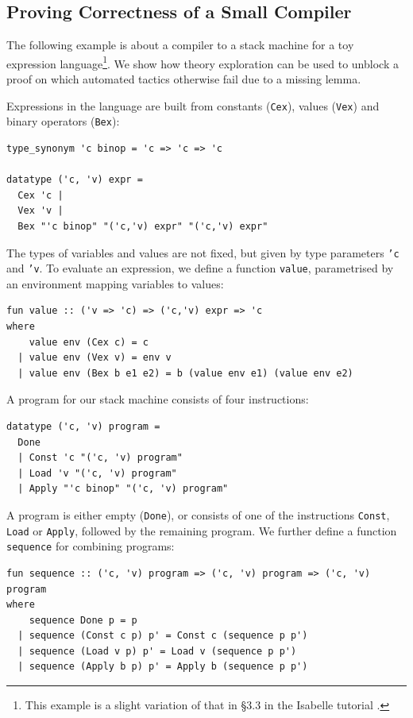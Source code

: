 \subsection{Proving Correctness of a Small Compiler}
\label{sec:comp-ex}
The following example is about a compiler to a stack machine for a toy
expression language\footnote{This example is a slight variation of that in \S3.3 in the Isabelle tutorial \cite{isabelle}. }. We show how theory exploration can be used to unblock a proof on which automated tactics otherwise fail due to a missing lemma.

Expressions in the language are built from constants (\texttt{Cex}), values (\texttt{Vex}) and binary operators (\texttt{Bex}): 
\begin{small}
\begin{verbatim}
type_synonym 'c binop = 'c => 'c => 'c

datatype ('c, 'v) expr =
  Cex 'c |
  Vex 'v |
  Bex "'c binop" "('c,'v) expr" "('c,'v) expr"
\end{verbatim}
\end{small}
The types of variables and values are not fixed, but given by type parameters \texttt{'c} and \texttt{'v}.
To evaluate an expression, we define a function \texttt{value}, parametrised by an environment mapping variables to values:
\begin{small}
\begin{verbatim}
fun value :: ('v => 'c) => ('c,'v) expr => 'c
where
    value env (Cex c) = c 
  | value env (Vex v) = env v
  | value env (Bex b e1 e2) = b (value env e1) (value env e2)
\end{verbatim}
\end{small}
A program for our stack machine consists of four instructions:
\begin{small}
\begin{verbatim}
datatype ('c, 'v) program =
  Done
  | Const 'c "('c, 'v) program"
  | Load 'v "('c, 'v) program"
  | Apply "'c binop" "('c, 'v) program"
\end{verbatim}
\end{small}
A program is either empty (\texttt{Done}), or consists of one of the instructions \texttt{Const}, \texttt{Load} or \texttt{Apply}, followed by the remaining program. We further define a function \texttt{sequence} for combining programs:
\begin{small}
\begin{verbatim}
fun sequence :: ('c, 'v) program => ('c, 'v) program => ('c, 'v) program
where
    sequence Done p = p
  | sequence (Const c p) p' = Const c (sequence p p')
  | sequence (Load v p) p' = Load v (sequence p p')
  | sequence (Apply b p) p' = Apply b (sequence p p') 
\end{verbatim}
\end{small}

